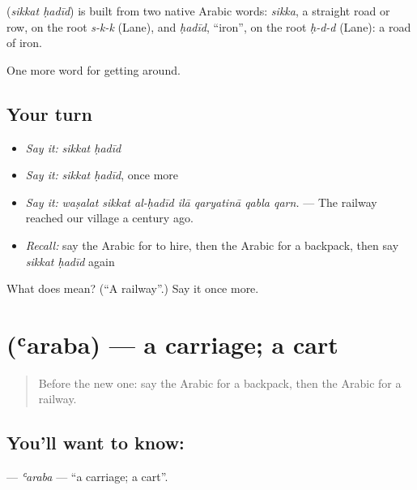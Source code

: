 \begin{cousinweb}
\textbf{ } (\emph{sikkat ḥadīd}) is built from two native Arabic words: \emph{sikka}, a straight road or row, on the root \emph{s-k-k} (Lane), and \emph{ḥadīd}, \textquotedblleft{}iron\textquotedblright{}, on the root \emph{ḥ-d-d} (Lane): a road of iron.
\end{cousinweb}

\begin{grammarlens}[title={What you've built}]
One more word for getting around.
\end{grammarlens}

\subsection*{Your turn}
\begin{itemize}
\raggedright
  \item \emph{Say it:} \emph{sikkat ḥadīd}
  \item \emph{Say it:} \emph{sikkat ḥadīd}, once more
  \item \emph{Say it:} \emph{waṣalat sikkat al-ḥadīd ilā qaryatinā qabla qarn.} — The railway reached our village a century ago.
  \item \emph{Recall:} say the Arabic for to hire, then the Arabic for a backpack, then say \emph{sikkat ḥadīd} again
\end{itemize}

\begin{tcolorbox}[breakable,colback=teal!4,colframe=teal!35!black,title={Before you move on}]
What does   mean? (\textquotedblleft{}A railway\textquotedblright{}.) Say it once more.
\end{tcolorbox}
\section[\texorpdfstring{\ar{عربة} (ʿaraba)}{عربة (ʿaraba)}]{ (ʿaraba) — a carriage; a cart}

\label{lesson:AR-C428-araba}



\begin{quote}
Before the new one: say the Arabic for a backpack, then the Arabic for a railway.
\end{quote}

\subsection*{You'll want to know: }
\textbf{} — \emph{ʿaraba} — \textquotedblleft{}a carriage; a cart\textquotedblright{}.

